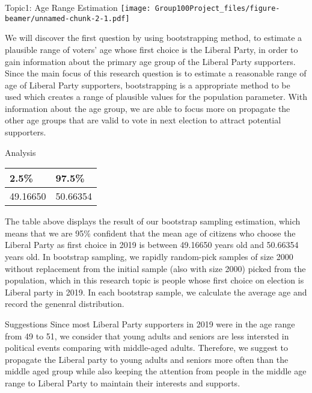 \documentclass[
  ignorenonframetext,
]{beamer}
\begin{document}
\begin{frame}{Topic1: Age Range Estimation}
\protect\hypertarget{topic1-age-range-estimation}{}
\texttt{[image: Group100Project\_files/figure-beamer/unnamed-chunk-2-1.pdf]}

We will discover the first question by using bootstrapping method, to
estimate a plausible range of voters' age whose first choice is the
Liberal Party, in order to gain information about the primary age group
of the Liberal Party supporters. Since the main focus of this research
question is to estimate a reasonable range of age of Liberal Party
supporters, bootstrapping is a appropriate method to be used which
creates a range of plausible values for the population parameter. With
information about the age group, we are able to focus more on propagate
the other age groups that are valid to vote in next election to attract
potential supporters.
\end{frame}

\begin{frame}{Analysis}
\protect\hypertarget{analysis}{}
\begin{longtable}[]{@{}ll@{}}
\toprule()
2.5\% & 97.5\% \\
\midrule()
\endhead
49.16650 & 50.66354 \\
\bottomrule()
\end{longtable}

The table above displays the result of our bootstrap sampling
estimation, which means that we are 95\% confident that the mean age of
citizens who choose the Liberal Party as first choice in 2019 is between
49.16650 years old and 50.66354 years old. In bootstrap sampling, we
rapidly random-pick samples of size 2000 without replacement from the
initial sample (also with size 2000) picked from the population, which
in this research topic is people whose first choice on election is
Liberal party in 2019. In each bootstrap sample, we calculate the
average age and record the genenral distribution.
\end{frame}

\begin{frame}{Suggestions}
\protect\hypertarget{suggestions}{}
Since most Liberal Party supporters in 2019 were in the age range from
49 to 51, we consider that young adults and seniors are less intersted
in political events comparing with middle-aged adults. Therefore, we
suggest to propagate the Liberal party to young adults and seniors more
often than the middle aged group while also keeping the attention from
people in the middle age range to Liberal Party to maintain their
interests and supports.
\end{frame}
\end{document}
